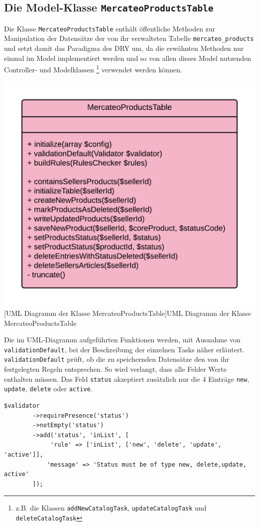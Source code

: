 {	\clearpage	
	\subsection{Die Model-Klasse \texttt{MercateoProductsTable}}
	
	Die Klasse \texttt{MercateoProductsTable} enthält öffentliche Methoden zur Manipulation der Datensätze der von ihr verwalteten Tabelle \texttt{mercateo\_products} und setzt damit das Paradigma des DRY um, da die erwähnten Methoden nur einmal im Model implementiert werden und so von allen dieses Model nutzenden Controller- und Modelklassen \footnote{z.B. die Klassen \texttt{addNewCatalogTask}, \texttt{updateCatalogTask} und \texttt{deleteCatalogTask}} verwendet werden können. \\
	\begin{minipage}{\linewidth}
		\vspace{1em}
		\centering
		\includegraphics[width=0.6 \linewidth]{img/MercateoProductsTableUML}
		[UML Diagramm der Klasse MercateoProductsTable]{UML Diagramm der Klasse MercateoProductsTable}
		\vspace{1em}
	\end{minipage}
	Die im UML-Diagramm aufgeführten Funktionen werden, mit Ausnahme von \texttt{validationDefault}, bei der Beschreibung der einzelnen Tasks näher erläutert. \texttt{validationDefault} prüft, ob die zu speichernden Datensätze den von ihr festgelegten Regeln entsprechen. So wird verlangt, dass alle Felder Werte enthalten müssen. Das Feld \texttt{status} akzeptiert zusätzlich nur die 4 Einträge \texttt{new}, \texttt{update}, \texttt{delete} oder \texttt{active}.
	
	\begin{lstlisting}[caption={Auszug aus der Validator Methode der Klasse MercateoProductsTable}] 
	$validator
     	->requirePresence('status')
     	->notEmpty('status')
     	->add('status', 'inList', [
        	 'rule' => ['inList', ['new', 'delete', 'update', 'active']],
         	'message' => 'Status must be of type new, delete,update, active'
     	]);
	\end{lstlisting}
	
}
